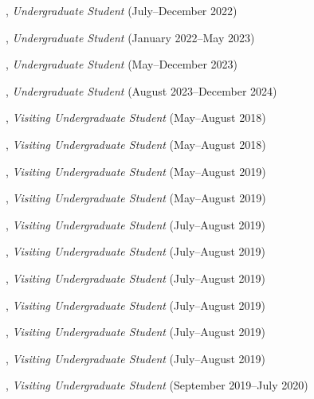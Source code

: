 \documentclass[10pt]{article}
\newenvironment{myindentpar}[1]%
{\begin{list}{}%
         {\setlength{\leftmargin}{#1}}%
         \item[]%
}
{\end{list}}
\newcounter{list}
\begin{document}
\begin{myindentpar}{0.75cm}
\hspace{-0.75cm}{\bf William Porter}, \textit{Undergraduate Student} (July--December 2022)

\hspace{-0.75cm}{\bf Weike Fang}, \textit{Undergraduate Student} (January 2022--May 2023)

\hspace{-0.75cm}{\bf David Liu}, \textit{Undergraduate Student} (May--December 2023)

\hspace{-0.75cm}{\bf John Flanagan}, \textit{Undergraduate Student} (August 2023--December 2024)

\hspace{-0.75cm}{\bf Wenhao Yu}, \textit{Visiting Undergraduate Student} (May--August 2018)

\hspace{-0.75cm}{\bf Yu Shu}, \textit{Visiting Undergraduate Student} (May--August 2018)

\hspace{-0.75cm}{\bf Chuchen Deng}, \textit{Visiting Undergraduate Student} (May--August 2019)

\hspace{-0.75cm}{\bf Yihong Ma}, \textit{Visiting Undergraduate Student} (May--August 2019)

\hspace{-0.75cm}{\bf Xin Liu}, \textit{Visiting Undergraduate Student} (July--August 2019)

\hspace{-0.75cm}{\bf Wei Peng}, \textit{Visiting Undergraduate Student} (July--August 2019)

\hspace{-0.75cm}{\bf Mengxia Yu}, \textit{Visiting Undergraduate Student} (July--August 2019)

\hspace{-0.75cm}{\bf Kaifeng Yu}, \textit{Visiting Undergraduate Student} (July--August 2019)

\hspace{-0.75cm}{\bf Zhihan Zhang}, \textit{Visiting Undergraduate Student} (July--August 2019)

\hspace{-0.75cm}{\bf Yang Zhou}, \textit{Visiting Undergraduate Student} (July--August 2019)

\hspace{-0.75cm}{\bf Zaitang Li}, \textit{Visiting Undergraduate Student} (September 2019--July 2020)


\end{myindentpar}
\end{document}

